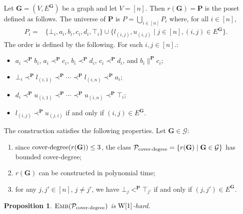 \documentclass[usletter]{article}
\newcommand{\longversion}[1]{#1}
\newcommand{\shortversion}[1]{}
\newcommand{\longshort}[2]{\longversion{#1}\shortversion{#2}}
\newcommand{\pp}{\mathbf{P}}
\newtheorem{proposition}{Proposition}
\begin{document}
Let $\mathbf{G}=(V,E^\mathbf{G})$ be a graph and let $V=[n]$.  Then $r(\mathbf{G})=\pp$ is the
poset defined as follows. The universe of $\pp$ is $P=\bigcup_{i \in [n]}P_i$ 
where, for all $i \in [n]$, 
\longshort{\begin{align*}
P_i = &\{ \bot_i,a_i,b_i,c_i,d_i,\top_i \} \cup \{ l_{(i,j)}, u_{(i,j)} \mid j \in [n], (i,j) \in E^{\mathbf{G}} \}\text{.}
\end{align*}}{\begin{align*}
P_i = &\{ \bot_i,a_i,b_i,c_i,d_i,\top_i \} \\
    & \cup \{ l_{(i,j)}, u_{(i,j)} \mid j \in [n], (i,j) \in E^{\mathbf{G}} \}\text{.}
\end{align*}}
The order is defined by the following. For each $i,j \in [n]$.:
\begin{itemize}
\item $a_i \prec^\pp b_i$, $a_i \prec^\pp c_i$, $b_i \prec^\pp d_i$, $c_i \prec^\pp d_i$, and $b_i \parallel^\pp c_i$; 
\item $\bot_i \prec^\pp l_{(i,1)} \prec^\pp  \cdots \prec^\pp l_{(i,n)} \prec^\pp a_i$;
\item $d_i \prec^\pp u_{(i,1)} \prec^\pp  \cdots \prec^\pp u_{(i,n)} \prec^\pp \top_i$;
\item $l_{(i,j)} \prec^\pp u_{(j,i)}$ if and only if $(i,j) \in E^{\mathbf{G}}$.
\end{itemize}
The construction satisfies the following properties.  Let $\mathbf{G} \in \mathcal{G}$:
\begin{enumerate}[label=\textit{(\roman*)}] 
\item since $\textup{cover\textup{-}degree}(r(\mathbf{G})) \leq 3$, 
the class $\mathcal{P}_{\textup{cover\textup{-}degree}}=\{ r(\mathbf{G}) \mid \mathbf{G} \in \mathcal{G} \}$ has bounded cover-degree;
\item $r(\mathbf{G})$ can be constructed in polynomial time;
\item for any $j,j'\in [n]$, $j \neq j'$, we have $\bot_j <^{\pp} \top_{j'}$ if and only if $(j,j')\in E^{\mathbf{G}}$.
\end{enumerate}


\longshort{\begin{proposition}}{\begin{proposition}[$\star$]}
\label{pr:harddegree}
$\textsc{Emb}(\mathcal{P}_{\textup{cover\textup{-}degree}})$ is $\textup{W}[1]$-hard.
\end{proposition}
\end{document}
